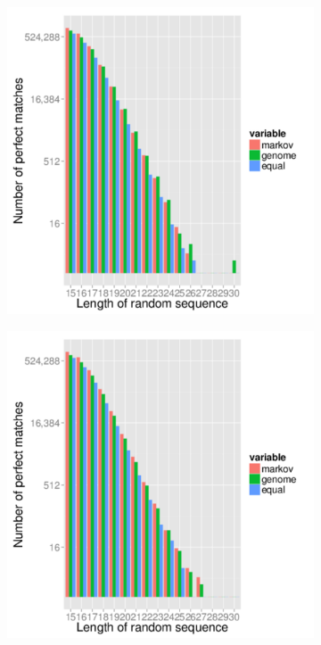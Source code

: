 \documentclass{article}
\begin{document}
\blindtext

\begin{figure}[t]
   \centering
   \begin{subfigure}{.5\textwidth}
      \centering
      \includegraphics[width=.9\textwidth,natwidth=100,natheight=100]{hg38_perfect_mapped_1000000.pdf}
      \caption{}
      \label{fig:hg38_mapped_perfect}
   \end{subfigure}%
   \begin{subfigure}{.5\textwidth}
      \centering
      \includegraphics[width=.9\textwidth,natwidth=100,natheight=100]{mm10_perfect_mapped_1000000.pdf}

\end{subfigure}
\end{figure}
\end{document}
